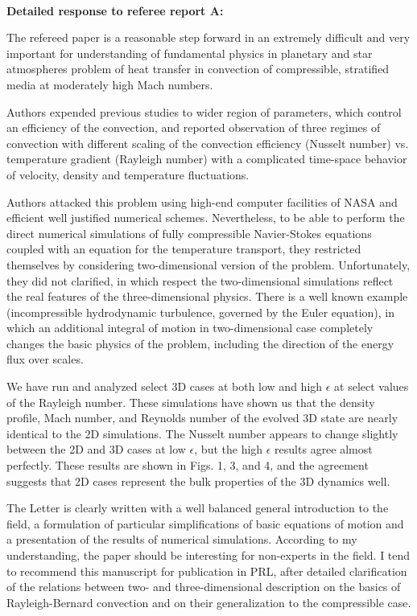 \documentclass[aps, 11pt, singlecolumn]{revtex4-1} %
\begin{document}
\begin{singlespace}
$\,$
\newline
$\,$
\newline

\textbf{Detailed response to referee report A:}

\begin{myquotation}
The refereed paper is a reasonable step forward in an extremely
difficult and very important for understanding of fundamental physics
in planetary and star atmospheres problem of heat transfer in
convection of compressible, stratified media at moderately high Mach
numbers.

Authors expended previous studies to wider region of parameters, which
control an efficiency of the convection, and reported observation of
three regimes of convection with different scaling of the convection
efficiency (Nusselt number) vs. temperature gradient (Rayleigh number)
with a complicated time-space behavior of velocity, density and
temperature fluctuations.

Authors attacked this problem using high-end computer facilities of
NASA and efficient well justified numerical schemes. Nevertheless, to
be able to perform the direct numerical simulations of fully
compressible Navier-Stokes equations coupled with an equation for the
temperature transport, they restricted themselves by considering
two-dimensional version of the problem. Unfortunately, they did not
clarified, in which respect the two-dimensional simulations reflect
the real features of the three-dimensional physics. There is a well
known example (incompressible hydrodynamic turbulence, governed by the
Euler equation), in which an additional integral of motion in
two-dimensional case completely changes the basic physics of the
problem, including the direction of the energy flux over scales.
\end{myquotation}

We have run and analyzed select 3D cases at both low and high $\epsilon$
at select values of the Rayleigh number.  These simulations have shown
us that the density profile, Mach number, and Reynolds number of the
evolved 3D state are nearly identical to the 2D simulations.  The Nusselt
number appears to change slightly between the 2D and 3D cases at low $\epsilon$, 
but the high $\epsilon$ results agree almost perfectly.  These results are shown
in Figs. 1, 3, and 4, and the agreement suggests that 2D cases
represent the bulk properties of the 3D dynamics well.

\begin{myquotation}
The Letter is clearly written with a well balanced general
introduction to the field, a formulation of particular simplifications
of basic equations of motion and a presentation of the results of
numerical simulations. According to my understanding, the paper should
be interesting for non-experts in the field. I tend to recommend this
manuscript for publication in PRL, after detailed clarification of the
relations between two- and three-dimensional description on the basics
of Rayleigh-Bernard convection and on their generalization to the
compressible case.
\end{myquotation}


\end{singlespace}
\end{document}
